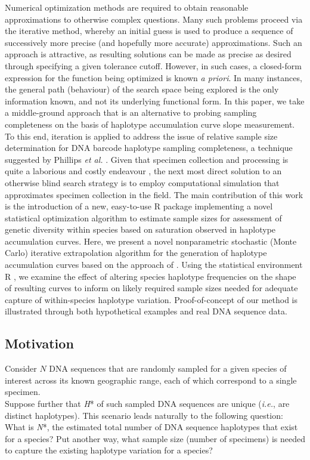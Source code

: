 Numerical optimization methods are required to obtain reasonable approximations to otherwise complex questions. Many such problems proceed via the iterative method, whereby an initial guess is used to produce a sequence of successively more precise (and hopefully more accurate) approximations. Such an approach is attractive, as resulting solutions can be made as precise as desired through specifying a given tolerance cutoff. However, in such cases, a closed-form expression for the function being optimized is known \textit{a priori}. In many instances, the general path (behaviour) of the search space being explored is the only information known, and not its underlying functional form. In this paper, we take a middle-ground approach that is an alternative to probing sampling completeness on the basis of haplotype accumulation curve slope measurement. To this end, iteration is applied to address the issue of relative sample size determination for DNA barcode haplotype sampling completeness, a technique suggested by Phillips \textit{et al.} \cite{phillips2019incomplete}. Given that specimen collection and processing is quite a laborious and costly endeavour \cite{cameron2006will, stein2014is}, the next most direct solution to an otherwise blind search strategy is to employ computational simulation that approximates specimen collection in the field. The main contribution of this work is the introduction of a new, easy-to-use R package implementing a novel statistical optimization algorithm to estimate sample sizes for assessment of genetic diversity within species based on saturation observed in haplotype accumulation curves. Here, we present a novel nonparametric stochastic (Monte Carlo) iterative extrapolation algorithm for the generation of haplotype accumulation curves based on the approach of \cite{phillips2015exploration}. Using the statistical environment R \cite{r2018language}, we examine the effect of altering species haplotype frequencies on the shape of resulting curves to inform on likely required sample sizes needed for adequate capture of within-species haplotype variation. Proof-of-concept of our method is illustrated through both hypothetical examples and real DNA sequence data.

\subsection{Motivation}

Consider $N$ DNA sequences that are randomly sampled for a given species of interest across its known geographic range, each of which correspond to a single specimen. \\ Suppose further that \textit{H}* of such sampled DNA sequences are unique (\textit{i.e.}, are distinct haplotypes). This scenario leads naturally to the following question: What is \textit{N}*, the estimated total number of DNA sequence haplotypes that exist for a species? Put another way, what sample size (number of specimens) is needed to capture the existing haplotype variation for a species? 

